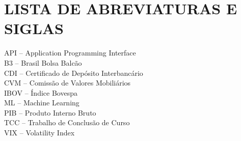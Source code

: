 
\chapter*{LISTA DE ABREVIATURAS E SIGLAS}

\vspace{1cm}

\noindent
API -- Application Programming Interface\\
B3 -- Brasil Bolsa Balcão\\
CDI -- Certificado de Depósito Interbancário\\
CVM -- Comissão de Valores Mobiliários\\
IBOV -- Índice Bovespa\\
ML -- Machine Learning\\
PIB -- Produto Interno Bruto\\
TCC -- Trabalho de Conclusão de Curso\\
VIX -- Volatility Index